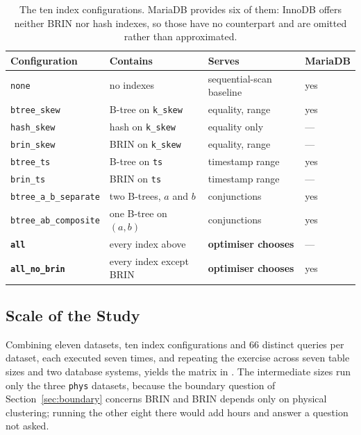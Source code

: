 \documentclass[12pt, a4paper]{article}
\begin{document}
\begin{table}[htbp]
\centering
\caption{The ten index configurations. MariaDB provides six of them:
InnoDB offers neither BRIN nor hash indexes, so those have no
counterpart and are omitted rather than approximated.}
\label{tab:arms}
\small
\begin{tabular}{@{}llll@{}}
\toprule
\textbf{Configuration} & \textbf{Contains} & \textbf{Serves} & \textbf{MariaDB} \\
\midrule
\texttt{none} & no indexes & sequential-scan baseline & yes \\
\texttt{btree\_skew} & B-tree on \texttt{k\_skew} & equality, range & yes \\
\texttt{hash\_skew} & hash on \texttt{k\_skew} & equality only & --- \\
\texttt{brin\_skew} & BRIN on \texttt{k\_skew} & equality, range & --- \\
\texttt{btree\_ts} & B-tree on \texttt{ts} & timestamp range & yes \\
\texttt{brin\_ts} & BRIN on \texttt{ts} & timestamp range & --- \\
\texttt{btree\_a\_b\_separate} & two B-trees, $a$ and $b$ & conjunctions & yes \\
\texttt{btree\_ab\_composite} & one B-tree on $(a,b)$ & conjunctions & yes \\
\midrule
\textbf{\texttt{all}} & every index above & \textbf{optimiser chooses} & --- \\
\textbf{\texttt{all\_no\_brin}} & every index except BRIN & \textbf{optimiser chooses} & yes \\
\bottomrule
\end{tabular}
\end{table}

\subsection{Scale of the Study}

Combining eleven datasets, ten index configurations and 66 distinct
queries per dataset, each executed seven times, and repeating the
exercise across seven table sizes and two database systems, yields the
matrix in . The intermediate sizes run only the three
\texttt{phys} datasets, because the boundary question of
Section~\ref{sec:boundary} concerns BRIN and BRIN depends only on
physical clustering; running the other eight there would add hours and
answer a question not asked.
\end{document}
